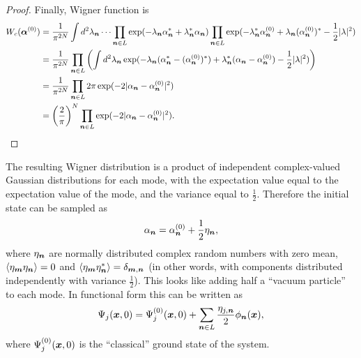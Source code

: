 \begin{proof}
Finally, Wigner function is
\begin{equation*}
\begin{split}
	W_c (\bm{\alpha}^{(0)})
	& = \frac{1}{\pi^{2N}} \int d^2\lambda_{\boldsymbol{n}} \dots
		\prod_{\boldsymbol{n} \in L} \exp(
			- \lambda_{\boldsymbol{n}} \alpha_{\boldsymbol{n}}^*
			+ \lambda_{\boldsymbol{n}}^* \alpha_{\boldsymbol{n}}
		)
		\prod_{\boldsymbol{n} \in L} \exp(
			- \lambda_{\boldsymbol{n}}^* \alpha_{\boldsymbol{n}}^{(0)}
			+ \lambda_{\boldsymbol{n}} (\alpha_{\boldsymbol{n}}^{(0)})^*
			- \frac{1}{2} |\lambda|^2
		) \\
	& = \frac{1}{\pi^{2N}} \prod_{\boldsymbol{n} \in L} \left(
		\int d^2\lambda_{\boldsymbol{n}}
			\exp(
				- \lambda_{\boldsymbol{n}} (\alpha_{\boldsymbol{n}}^* - (\alpha_{\boldsymbol{n}}^{(0)})^*)
				+ \lambda_{\boldsymbol{n}}^* (\alpha_{\boldsymbol{n}} - \alpha_{\boldsymbol{n}}^{(0)})
				- \frac{1}{2} |\lambda|^2
			)
	\right) \\
	& = \frac{1}{\pi^{2N}} \prod_{\boldsymbol{n} \in L}
		2 \pi \exp(-2 |\alpha_{\boldsymbol{n}} - \alpha_{\boldsymbol{n}}^{(0)}|^2) \\
	& = \left( \frac{2}{\pi} \right)^N \prod_{\boldsymbol{n} \in L}
		\exp(-2 |\alpha_{\boldsymbol{n}} - \alpha_{\boldsymbol{n}}^{(0)}|^2).
	\qedhere
\end{split}
\end{equation*}
\end{proof}

The resulting Wigner distribution is a product of independent complex-valued Gaussian distributions for each mode,
with the expectation value equal to the expectation value of the mode,
and the variance equal to $\frac{1}{2}$.
Therefore the initial state can be sampled as
\[
	\alpha_{\boldsymbol{n}} = \alpha_{\boldsymbol{n}}^{(0)} + \frac{1}{2} \eta_{\boldsymbol{n}},
\]
where $\eta_{\boldsymbol{n}}$ are normally distributed complex random numbers with zero mean,
$\langle \eta_{\boldsymbol{m}} \eta_{\boldsymbol{n}} \rangle = 0$ and
$\langle \eta_{\boldsymbol{m}} \eta_{\boldsymbol{n}}^* \rangle = \delta_{\boldsymbol{m},\boldsymbol{n}}$
(in other words, with components distributed independently with variance $\frac{1}{2}$).
This looks like adding half a ``vacuum particle'' to each mode.
In functional form this can be written as
\[
	\Psi_j(\boldsymbol{x}, 0)
	= \Psi_j^{(0)}(\boldsymbol{x}, 0)
		+ \sum_{\boldsymbol{n} \in L} \frac{\eta_{j,\boldsymbol{n}}}{2} \phi_{\boldsymbol{n}}(\boldsymbol{x}),
\]
where $\Psi_j^{(0)}(\boldsymbol{x}, 0)$ is the ``classical'' ground state of the system.
